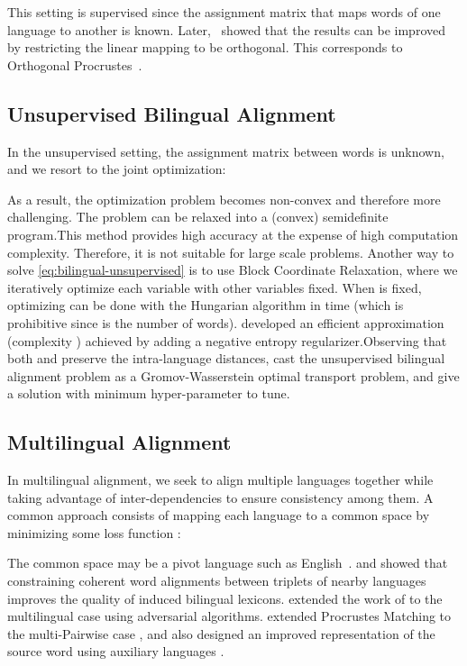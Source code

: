 \documentclass{article}
\begin{document}
This setting is supervised since the assignment matrix  that maps words of one language to another is known. Later,~\cite{Xing2015NormalizedWE} showed that the results can be improved by restricting the linear mapping  to be orthogonal. This corresponds to Orthogonal Procrustes~\cite{Schonemann1966}.  

\subsection{Unsupervised Bilingual Alignment}

In the unsupervised setting, the assignment matrix  between words is unknown, and we resort to the joint optimization:

As a result, the optimization problem becomes non-convex and therefore more challenging. The problem can be relaxed into a (convex) semidefinite program.This method provides high accuracy at the expense of high computation complexity. Therefore, it is not suitable for large scale problems.  Another way to solve \eqref{eq:bilingual-unsupervised} is to use Block Coordinate Relaxation, where we iteratively optimize each variable with other variables fixed.  When  is fixed, optimizing  can be done with the Hungarian algorithm in  time (which is prohibitive since  is the number of words). \citet{cuturi2014fast} developed an efficient approximation (complexity ) achieved by adding a negative entropy regularizer.Observing that both  and  preserve the intra-language distances, \citet{AlvarezMelisJaakkola18} cast the unsupervised bilingual alignment problem as a Gromov-Wasserstein optimal transport problem, and give a solution with minimum hyper-parameter to tune.


\subsection{Multilingual Alignment}

In multilingual alignment, we seek to align multiple languages together while taking advantage of inter-dependencies to ensure consistency among them.  A common approach consists of mapping each language to a common space  by minimizing some loss function :

The common space may be a pivot language such as English~\cite{smith2017offline,LampleCRDJ18,JoulinBMJG18}.  \citet{nakashole-flauger-2017-knowledge} and \citet{AlauxGCJ19} showed that constraining coherent word alignments between triplets of nearby languages improves the quality of induced bilingual lexicons.  
\citet{ChenCardie18} extended the work of \cite{LampleCRDJ18} to the multilingual case using adversarial algorithms. \citeauthor{TaitelbaumCG19b} extended Procrustes Matching to the multi-Pairwise case \cite{TaitelbaumCG19a}, and also designed an improved representation of the source word using auxiliary languages \cite{TaitelbaumCG19b}.
 
\end{document}
